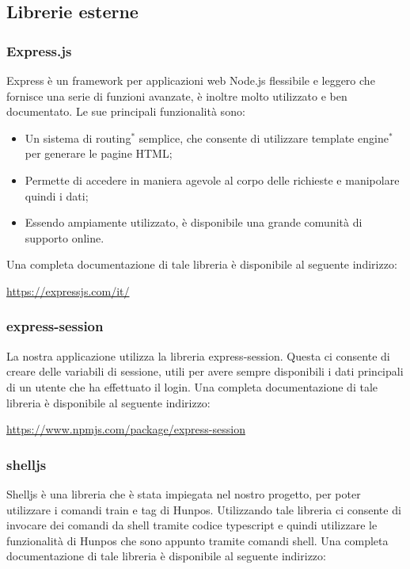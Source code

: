 \subsection{Librerie esterne}
\subsubsection{Express.js}

Express è un framework per applicazioni web Node.js flessibile e leggero che fornisce una serie di funzioni avanzate, è inoltre molto utilizzato e ben documentato. Le sue principali funzionalità sono:
\begin{itemize}
	\item Un sistema di routing$^*$ semplice, che consente di utilizzare template engine$^*$ per generare le pagine HTML;
	\item Permette di accedere in maniera agevole al corpo delle richieste e manipolare quindi i dati;
	\item Essendo ampiamente utilizzato, è disponibile una grande comunità di supporto online.
\end{itemize}
Una completa documentazione di tale libreria è disponibile al seguente indirizzo:
\begin{center}
	\url{https://expressjs.com/it/}
\end{center}
\subsubsection{express-session}
La nostra applicazione utilizza la libreria express-session. Questa ci consente di creare delle variabili di sessione, utili per avere sempre disponibili i dati principali di un utente che ha effettuato il login.
Una completa documentazione di tale libreria è disponibile al seguente indirizzo:
\begin{center}
	\url{https://www.npmjs.com/package/express-session}
\end{center}
\subsubsection{shelljs}
Shelljs è una libreria che è stata impiegata nel nostro progetto, per poter utilizzare i comandi train e tag di Hunpos. Utilizzando tale libreria ci consente di invocare dei comandi da shell tramite codice typescript e quindi utilizzare le funzionalità di Hunpos che sono appunto tramite comandi shell.
Una completa documentazione di tale libreria è disponibile al seguente indirizzo:


